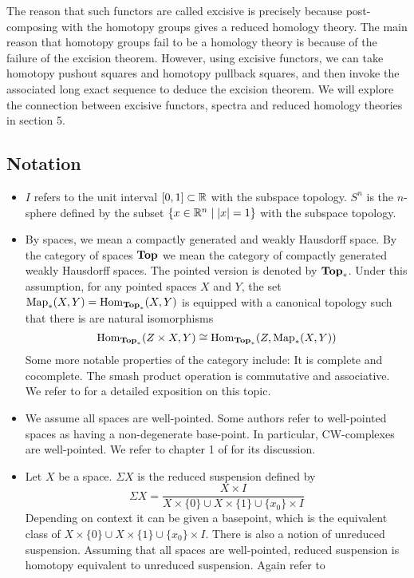 The reason that such functors are called excisive is precisely because post-composing with the homotopy groups gives a reduced homology theory. The main reason that homotopy groups fail to be a homology theory is because of the failure of the excision theorem. However, using excisive functors, we can take homotopy pushout squares and homotopy pullback squares, and then invoke the associated long exact sequence to deduce the excision theorem. We will explore the connection between excisive functors, spectra and reduced homology theories in section 5. 

\subsection{Notation}
\begin{itemize}
\item $I$ refers to the unit interval $[0,1]\subset\mathbb{R}$ with the subspace topology. $S^n$ is the $n$-sphere defined by the subset $\{x\in\mathbb{R}^n\;|\;\abs{x}=1\}$ with the subspace topology. 
\item By spaces, we mean a compactly generated and weakly Hausdorff space. By the category of spaces $\bold{Top}$ we mean the category of compactly generated weakly Hausdorff spaces. The pointed version is denoted by $\bold{Top}_\ast$. Under this assumption, for any pointed spaces $X$ and $Y$, the set $\text{Map}_\ast(X,Y)=\operatorname{Hom}_{\bold{Top}_\ast}(X,Y)$ is equipped with a canonical topology such that there is are natural isomorphisms $$\operatorname{Hom}_{\bold{Top}_\ast}(Z\times X,Y)\cong\operatorname{Hom}_{\bold{Top}_\ast}(Z,\text{Map}_\ast(X,Y))$$ Some more notable properties of the category include: It is complete and cocomplete. The smash product operation is commutative and associative. We refer to \cite{CGWH} for a detailed exposition on this topic. 
\item We assume all spaces are well-pointed. Some authors refer to well-pointed spaces as having a non-degenerate base-point. In particular, CW-complexes are well-pointed. We refer to chapter 1 of \cite{CHT} for its discussion. 
\item Let $X$ be a space. $\Sigma X$ is the reduced suspension defined by $$\Sigma X=\frac{X\times I}{X\times\{0\}\cup X\times\{1\}\cup\{x_0\}\times I}$$ Depending on context it can be given a basepoint, which is the equivalent class of $X\times\{0\}\cup X\times\{1\}\cup\{x_0\}\times I$. There is also a notion of unreduced suspension. Assuming that all spaces are well-pointed, reduced suspension is homotopy equivalent to unreduced suspension. Again refer to \cite{CHT}

\end{itemize}
